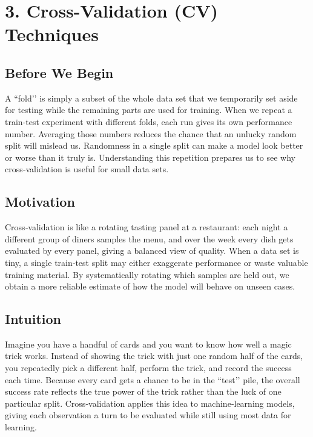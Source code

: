 \documentclass[12pt, a4paper]{article}
\begin{document}
\section{3. Cross-Validation (CV) Techniques}

\subsection{Before We Begin}
A “fold’’ is simply a subset of the whole data set that we temporarily set aside for testing while the remaining parts are used for training.  
When we repeat a train‑test experiment with different folds, each run gives its own performance number.  
Averaging those numbers reduces the chance that an unlucky random split will mislead us.  
Randomness in a single split can make a model look better or worse than it truly is.  
Understanding this repetition prepares us to see why cross‑validation is useful for small data sets.  

\subsection{Motivation}
Cross‑validation is like a rotating tasting panel at a restaurant: each night a different group of diners samples the menu, and over the week every dish gets evaluated by every panel, giving a balanced view of quality.  
When a data set is tiny, a single train‑test split may either exaggerate performance or waste valuable training material.  
By systematically rotating which samples are held out, we obtain a more reliable estimate of how the model will behave on unseen cases.  

\subsection{Intuition}
Imagine you have a handful of cards and you want to know how well a magic trick works.  
Instead of showing the trick with just one random half of the cards, you repeatedly pick a different half, perform the trick, and record the success each time.  
Because every card gets a chance to be in the “test’’ pile, the overall success rate reflects the true power of the trick rather than the luck of one particular split.  
Cross‑validation applies this idea to machine‑learning models, giving each observation a turn to be evaluated while still using most data for learning.  
\end{document}

